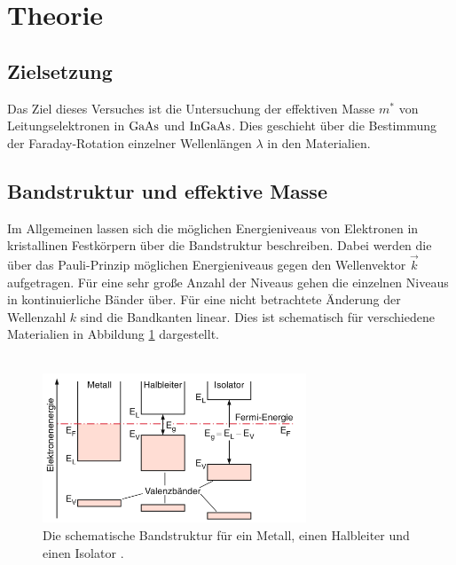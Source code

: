 \section{Theorie}

\subsection{Zielsetzung}

\noindent 
Das Ziel dieses Versuches ist die Untersuchung der effektiven Masse $m^*$ von Leitungselektronen in $\ce{GaAs}$ und $\ce{InGaAs}$. 
Dies geschieht über die Bestimmung der Faraday-Rotation einzelner Wellenlängen $\lambda$ in den Materialien.

\subsection{Bandstruktur und effektive Masse}
       

\noindent
Im Allgemeinen lassen sich die möglichen Energieniveaus von Elektronen in kristallinen Festkörpern über die Bandstruktur beschreiben. 
Dabei werden die über das Pauli-Prinzip möglichen Energieniveaus gegen den Wellenvektor $\vec{k}$ aufgetragen. 
Für eine sehr große Anzahl der Niveaus gehen die einzelnen Niveaus in kontinuierliche Bänder über.
Für eine nicht betrachtete Änderung der Wellenzahl $k$ sind die Bandkanten linear. 
Dies ist schematisch für verschiedene Materialien in Abbildung \ref{img:Band} dargestellt.\\\\

\begin{figure}[H]
    \centering
    \includegraphics[width=0.7\textwidth]{latex/images/band.PNG}
    \caption{Die schematische Bandstruktur für ein Metall, einen Halbleiter und einen Isolator \protect \cite{Dem}.}
    \label{img:Band}
\end{figure}

